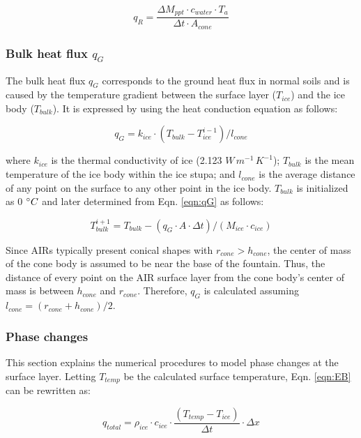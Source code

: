 \begin{equation}
	q_{R} = \frac{ \Delta M_{ppt} \cdot c_{water} \cdot T_a}{\Delta t \cdot A_{cone}}
	\label{eqn:qR}
\end{equation}

\subsubsection{Bulk heat flux \texorpdfstring{$q_{G}$}{Lg}} \label{sec:Bulkflux}

The bulk heat flux $q_{G}$ corresponds to the ground heat flux in normal soils and is caused by the
temperature gradient between the surface layer ($T_{ice}$) and the ice body ($T_{bulk}$). It is expressed by
using the heat conduction equation as follows:

\begin{equation} q_{G} = k_{ice} \cdot (T_{bulk}-T_{ice}^{i-1})/l_{cone} \label{eqn:qG}    \end{equation}

where $k_{ice}$ is the thermal conductivity of ice (2.123 $W\, m^{-1}\,K^{-1}$); $T_{bulk}$ is the mean
temperature of the ice body within the ice stupa; and $l_{cone}$ is the average distance of any point on the
surface to any other point in the ice body. $T_{bulk}$ is initialized as 0 $^{\circ} C$ and later determined from
Eqn. \ref{eqn:qG} as follows:

\begin{equation} T_{bulk}^{i+1} = T_{bulk} - (q_{G} \cdot A \cdot \Delta t)/(M_{ice} \cdot c_{ice}) \end{equation}

Since \ac{AIRs} typically present conical shapes with $r_{cone} > h_{cone}$, the center of mass of the cone body is
assumed to be near the base of the fountain. Thus, the distance of every point on the \ac{AIR} surface layer from the
cone body's center of mass is between $h_{cone}$ and $r_{cone}$. Therefore, $q_{G}$ is calculated assuming
$l_{cone} = (r_{cone} + h_{cone})/2$.

\subsubsection{Phase changes} \label{sec:phase}

This section explains the numerical procedures to model phase changes at the surface layer. Letting
$T_{temp}$ be the calculated surface temperature, Eqn. \ref{eqn:EB} can be rewritten as:

$$q_{total} =\rho_{ice} \cdot c_{ice} \cdot \frac{(T_{temp}-T_{ice})}{\Delta t} \cdot \Delta x$$

